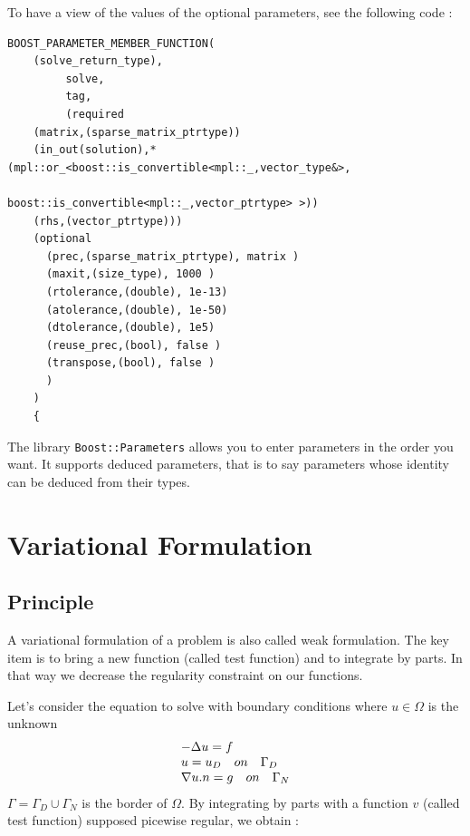 To have a view of the values of the optional parameters, see the following code :

\begin{lstlisting}
BOOST_PARAMETER_MEMBER_FUNCTION(
	(solve_return_type),
         solve,
         tag,
         (required
	(matrix,(sparse_matrix_ptrtype))
	(in_out(solution),*(mpl::or_<boost::is_convertible<mpl::_,vector_type&>,
                                         boost::is_convertible<mpl::_,vector_ptrtype> >))
	(rhs,(vector_ptrtype)))
	(optional
	  (prec,(sparse_matrix_ptrtype), matrix )
	  (maxit,(size_type), 1000 )
	  (rtolerance,(double), 1e-13)
	  (atolerance,(double), 1e-50)
	  (dtolerance,(double), 1e5)
	  (reuse_prec,(bool), false )
	  (transpose,(bool), false )
	  )
	)
    {
\end{lstlisting}

\noindent The library \lstinline!Boost::Parameters! allows you to enter parameters in the order you want. It supports deduced parameters,  that is to say parameters whose identity can be deduced from their types.

\section{Variational Formulation}
\label{sec:vari-form}

\subsection{Principle}
\label{sec:vari-form-princip}
A variational formulation of a problem is also called weak formulation. The key
item is to bring a new function (called test function) and to integrate by
parts. In that way we decrease the regularity constraint on our functions.

Let's consider the equation to solve with boundary conditions where $u  \in \varOmega$ is the unknown
\begin{equation}
\begin{array}{l l l}
	-\Delta u = f  \\
	u = u_D \quad on \quad \Gamma_D \\
	\nabla u.n = g \quad on \quad \Gamma_N
\end{array}
\end{equation}
$\Gamma = \Gamma_D \cup \Gamma_N$ is the border of $\varOmega$. By integrating by parts with a function $v$ (called test function) supposed picewise regular, we obtain :

